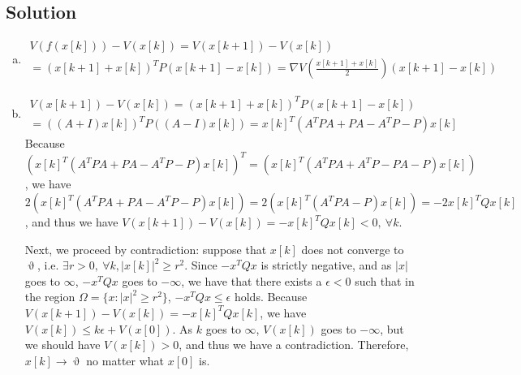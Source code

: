 \documentclass[11pt]{report}
\theoremstyle{definition}
\newcommand{\xlr}[2]{#1 \left(#2\right)}
\begin{document}
\subsection*{Solution}
\begin{enumerate}[(a), noitemsep]
\item
\begin{multline*}
\xlr{V}{\xlr{f}{x[k]}} - \xlr{V}{x[k]} = \xlr{V}{x[k+1]} - \xlr{V}{x[k]} \\= (x[k+1] + x[k])^T P (x[k+1] - x[k]) = \nabla \xlr{V}{\frac{x[k+1] + x[k]}{2}} (x[k+1] - x[k])
\end{multline*}
\item
\begin{multline*}
\xlr{V}{x[k+1]} - \xlr{V}{x[k]} = (x[k+1] + x[k])^T P (x[k+1] - x[k])\\
= \xlr{}{(A+I)x[k]}^T P \xlr{}{(A-I)x[k]} = x[k]^T (A^T P A + PA - A^T P - P) x[k]
\end{multline*}
Because $\xlr{}{x[k]^T (A^T P A + PA - A^T P - P) x[k]}^T = \xlr{}{x[k]^T (A^T P A + A^T P - PA - P) x[k]}$, we have $2\xlr{}{x[k]^T (A^T P A + PA - A^T P - P) x[k]} = 2\xlr{}{x[k]^T (A^T P A - P) x[k]} = -2 x[k]^T Q x[k]$, and thus we have
$\xlr{V}{x[k+1]} - \xlr{V}{x[k]} = -x[k]^T Q x[k] < 0,~\forall k$.

Next, we proceed by contradiction: suppose that $x[k]$ does not converge to $\upvartheta$, i.e. $\exists r > 0,~\forall k, |x[k]|^2 \geq r^2$. Since $-x^T Q x$ is strictly negative, and as $|x|$ goes to $\infty$, $-x^T Q x$ goes to $-\infty$, we have that there exists a $\epsilon < 0$ such that in the region $\Omega = \{x: |x|^2 \geq r^2\}$, $-x^T Q x \leq \epsilon$ holds. Because $\xlr{V}{x[k+1]} - \xlr{V}{x[k]} = -x[k]^T Q x[k]$, we have $\xlr{V}{x[k]} \leq k \epsilon + \xlr{V}{x[0]}$. As $k$ goes to $\infty$, $\xlr{V}{x[k]}$ goes to $-\infty$, but we should have $\xlr{V}{x[k]} > 0$, and thus we have a contradiction. Therefore, $x[k] \to \upvartheta$ no matter what $x[0]$ is.

\end{enumerate}
\end{document}
